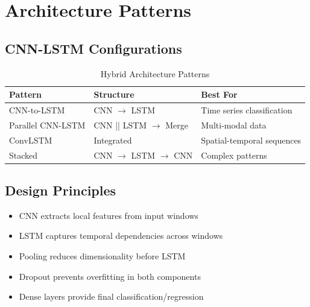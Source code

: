 \documentclass[12pt,a4paper]{article}
\begin{document}
\section{Architecture Patterns}

\subsection{CNN-LSTM Configurations}

\begin{table}[H]
\centering
\caption{Hybrid Architecture Patterns}
\begin{tabular}{lll}
\toprule
\textbf{Pattern} & \textbf{Structure} & \textbf{Best For} \\
\midrule
CNN-to-LSTM & CNN $\rightarrow$ LSTM & Time series classification \\
Parallel CNN-LSTM & CNN || LSTM $\rightarrow$ Merge & Multi-modal data \\
ConvLSTM & Integrated & Spatial-temporal sequences \\
Stacked & CNN $\rightarrow$ LSTM $\rightarrow$ CNN & Complex patterns \\
\bottomrule
\end{tabular}
\end{table}

\subsection{Design Principles}

\begin{tcolorbox}[colback=hybridpurple!10, colframe=hybridpurple, title=CNN-LSTM Design Guidelines]
\begin{itemize}
    \item CNN extracts local features from input windows
    \item LSTM captures temporal dependencies across windows
    \item Pooling reduces dimensionality before LSTM
    \item Dropout prevents overfitting in both components
    \item Dense layers provide final classification/regression
\end{itemize}
\end{tcolorbox}

\end{document}
